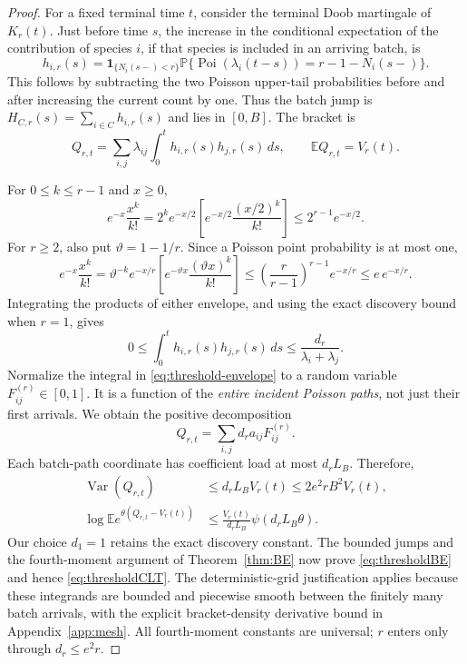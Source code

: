 \documentclass[11pt]{article}
\numberwithin{equation}{section}
\theoremstyle{definition}
\theoremstyle{remark}
\newcommand{\E}{\mathbb E}
\newcommand{\Pp}{\mathbb P}
\newcommand{\ind}{\mathbf 1}
\newcommand{\Var}{\operatorname{Var}}
\newcommand{\Poi}{\operatorname{Poi}}
\begin{document}
\begin{proof}
For a fixed terminal time $t$, consider the terminal Doob martingale of
$K_r(t)$. Just before time $s$, the increase in the conditional expectation of
the contribution of species $i$, if that species is included in an arriving
batch, is
\begin{equation}\label{eq:threshold-h}
 h_{i,r}(s)=\ind_{\{N_i(s-)<r\}}
 \Pp\{\Poi(\lambda_i(t-s))=r-1-N_i(s-)\}.
\end{equation}
This follows by subtracting the two Poisson upper-tail probabilities before
and after increasing the current count by one. Thus the batch jump is
$H_{C,r}(s)=\sum_{i\in C}h_{i,r}(s)$ and lies in $[0,B]$.
The bracket is
\begin{equation}\label{eq:thresholdQ}
 Q_{r,t}=\sum_{i,j}\lambda_{ij}\int_0^t h_{i,r}(s)h_{j,r}(s)\,ds,
 \qquad \E Q_{r,t}=V_r(t).
\end{equation}

For $0\le k\le r-1$ and $x\ge0$,
\[
 e^{-x}\frac{x^k}{k!}
 =2^k e^{-x/2}\left[e^{-x/2}\frac{(x/2)^k}{k!}\right]
 \le2^{r-1}e^{-x/2}.
\]
For $r\ge2$, also put $\vartheta=1-1/r$. Since a Poisson point probability
is at most one,
\[
 e^{-x}\frac{x^k}{k!}
 =\vartheta^{-k}e^{-x/r}
       \left[e^{-\vartheta x}\frac{(\vartheta x)^k}{k!}\right]
 \le\left(\frac r{r-1}\right)^{r-1}e^{-x/r}
 \le e\,e^{-x/r}.
\]
Integrating the products of either envelope, and using the exact discovery
bound when $r=1$, gives
\begin{equation}\label{eq:threshold-envelope}
 0\le\int_0^t h_{i,r}(s)h_{j,r}(s)\,ds
 \le\frac{d_r}{\lambda_i+\lambda_j}.
\end{equation}
Normalize the integral in \eqref{eq:threshold-envelope} to a random variable
$F_{ij}^{(r)}\in[0,1]$. It is a function of the \emph{entire incident Poisson
paths}, not just their first arrivals. We obtain the positive decomposition
\[
 Q_{r,t}=\sum_{i,j}d_r a_{ij}F_{ij}^{(r)}.
\]
Each batch-path coordinate has coefficient load at most $d_rL_B$. Therefore,
\begin{align}
 \Var(Q_{r,t})&\le d_rL_BV_r(t)\le2e^2rB^2V_r(t),\label{eq:thresholdbracketvar}\\
 \log\E e^{\theta(Q_{r,t}-V_r(t))}
 &\le\frac{V_r(t)}{d_rL_B}\psi(d_rL_B\theta).
 \label{eq:thresholdbracketmgf}
\end{align}
Our choice $d_1=1$ retains the exact discovery constant.
The bounded jumps and the fourth-moment argument of
Theorem~\ref{thm:BE} now prove \eqref{eq:thresholdBE} and hence
\eqref{eq:thresholdCLT}. The deterministic-grid justification applies because
these integrands are bounded and piecewise smooth between the finitely many
batch arrivals, with the explicit bracket-density derivative bound in
Appendix~\ref{app:mesh}. All fourth-moment constants are universal;
$r$ enters only through $d_r\le e^2r$.
\end{proof}
\end{document}
